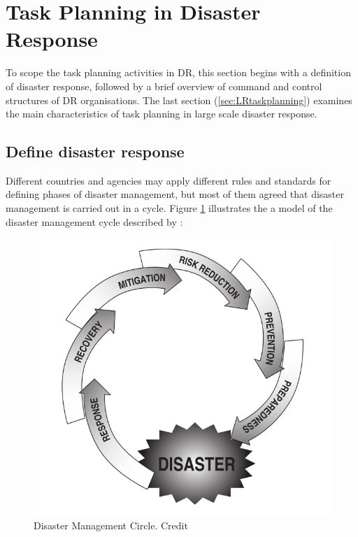 \section{Task Planning in Disaster Response}\label{sec:lrplanning}
To scope the task planning activities in \ac{DR}, this section begins with a definition of disaster response, followed by a brief overview of command and control structures of \ac{DR} organisations. The last section (\ref{sec:LRtaskplanning}) examines the main characteristics of task planning in large scale disaster response.\\

\subsection{Define disaster response}
Different countries and agencies may apply different rules and standards for defining phases of disaster management, but most of them agreed that disaster management is carried out in a cycle. Figure \ref{fig:drCircle} illustrates the a model of the disaster management cycle described by \citep{Wattegama2012}:\\

\begin{figure}[h]
  \centering
  \includegraphics[width=1\textwidth]{img/Background/drCircle}
  \caption{Disaster Management Circle. Credit \cite{Wattegama2012}}
  \label{fig:drCircle}
\end{figure}

